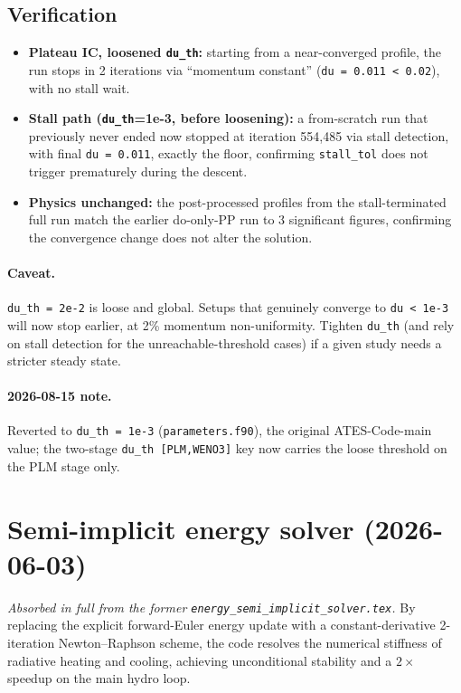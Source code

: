 \documentclass[english,a4paper]{my_memo}
\begin{document}
\subsection{Verification}
\begin{itemize}
\item \textbf{Plateau IC, loosened \texttt{du\_th}:} starting from a near-converged
  profile, the run stops in 2 iterations via ``momentum constant''
  (\verb|du = 0.011 < 0.02|), with no stall wait.
\item \textbf{Stall path (\texttt{du\_th}=1e-3, before loosening):} a from-scratch
  run that previously never ended now stopped at iteration 554{,}485 via stall
  detection, with final \verb|du = 0.011|, exactly the floor, confirming
  \verb|stall_tol| does not trigger prematurely during the descent.
\item \textbf{Physics unchanged:} the post-processed profiles from the
  stall-terminated full run match the earlier do-only-PP run to 3 significant
  figures, confirming the convergence change does not alter the solution.
\end{itemize}

\paragraph{Caveat.} \verb|du_th = 2e-2| is loose and global. Setups that genuinely
converge to \verb|du < 1e-3| will now stop earlier, at 2\% momentum non-uniformity.
Tighten \verb|du_th| (and rely on stall detection for the unreachable-threshold
cases) if a given study needs a stricter steady state.

\paragraph{2026-08-15 note.} Reverted to \verb|du_th = 1e-3|
(\texttt{parameters.f90}), the original ATES-Code-main value; the two-stage
\verb|du_th [PLM,WENO3]| key now carries the loose threshold on the PLM stage
only.

\section{Semi-implicit energy solver (2026-06-03)}\label{sec:semi}
\emph{Absorbed in full from the former \texttt{energy\_semi\_implicit\_solver.tex}.}
By replacing the explicit forward-Euler energy update with a constant-derivative
2-iteration Newton--Raphson scheme, the code resolves the numerical stiffness of
radiative heating and cooling, achieving unconditional stability and a $2\times$
speedup on the main hydro loop.
\end{document}
